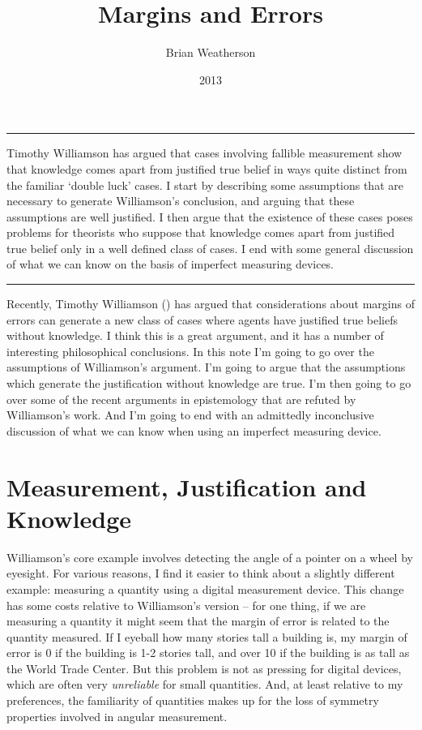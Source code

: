 \documentclass[
  10pt,
  letterpaper,
  DIV=11,
  numbers=noendperiod,
  twoside]{scrartcl}
\title{Margins and Errors}
\author{Brian Weatherson}
\date{2013}
\renewenvironment{abstract}
 {\vspace{-1.25cm}
 \quotation\small\noindent\rule{\linewidth}{.5pt}\par\smallskip
 \noindent }
 {\par\noindent\rule{\linewidth}{.5pt}\endquotation}
\begin{document}
\maketitle
\begin{abstract}
Timothy Williamson has argued that cases involving fallible measurement
show that knowledge comes apart from justified true belief in ways quite
distinct from the familiar `double luck' cases. I start by describing
some assumptions that are necessary to generate Williamson's conclusion,
and arguing that these assumptions are well justified. I then argue that
the existence of these cases poses problems for theorists who suppose
that knowledge comes apart from justified true belief only in a well
defined class of cases. I end with some general discussion of what we
can know on the basis of imperfect measuring devices.
\end{abstract}


Recently, Timothy Williamson ()
has argued that considerations about margins of errors can generate a
new class of cases where agents have justified true beliefs without
knowledge. I think this is a great argument, and it has a number of
interesting philosophical conclusions. In this note I'm going to go over
the assumptions of Williamson's argument. I'm going to argue that the
assumptions which generate the justification without knowledge are true.
I'm then going to go over some of the recent arguments in epistemology
that are refuted by Williamson's work. And I'm going to end with an
admittedly inconclusive discussion of what we can know when using an
imperfect measuring device.

\section{Measurement, Justification and
Knowledge}\label{measurement-justification-and-knowledge}

Williamson's core example involves detecting the angle of a pointer on a
wheel by eyesight. For various reasons, I find it easier to think about
a slightly different example: measuring a quantity using a digital
measurement device. This change has some costs relative to Williamson's
version -- for one thing, if we are measuring a quantity it might seem
that the margin of error is related to the quantity measured. If I
eyeball how many stories tall a building is, my margin of error is 0 if
the building is 1-2 stories tall, and over 10 if the building is as tall
as the World Trade Center. But this problem is not as pressing for
digital devices, which are often very \emph{unreliable} for small
quantities. And, at least relative to my preferences, the familiarity of
quantities makes up for the loss of symmetry properties involved in
angular measurement.
\end{document}
